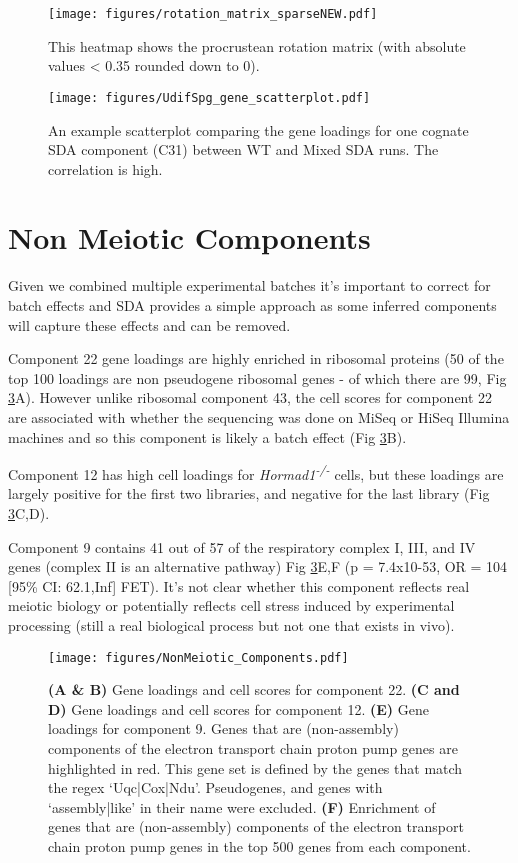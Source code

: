 \begin{figure}[H]
	\centering
	\texttt{[image: figures/rotation\_matrix\_sparseNEW.pdf]}
	\caption{This heatmap shows the procrustean rotation matrix (with absolute values < 0.35 rounded down to 0).}
	\label{fig:WT_Mix_Rotation}
\end{figure}

\begin{figure}[H]
	\centering
	\texttt{[image: figures/UdifSpg\_gene\_scatterplot.pdf]}
	\caption{An example scatterplot comparing the gene loadings for one cognate SDA component (C31) between WT and Mixed SDA runs. The correlation is high.}
	\label{fig:WT_Mix_Correlation}
\end{figure}


\section{Non Meiotic Components}

Given we combined multiple experimental batches it's important to correct for batch effects and SDA provides a simple approach as some inferred components will capture these effects and can be removed.

Component 22 gene loadings are highly enriched in ribosomal proteins (50 of the top 100 loadings are non pseudogene ribosomal genes - of which there are 99, Fig \ref{fig:NonMeiotic}A). However unlike ribosomal component 43, the cell scores for component 22 are associated with whether the sequencing was done on MiSeq or HiSeq Illumina machines and so this component is likely a batch effect (Fig \ref{fig:NonMeiotic}B).

Component 12 has high cell loadings for \textit{Hormad1\textsuperscript{-/-}} cells, but these loadings are largely positive for the first two libraries, and negative for the last library (Fig \ref{fig:NonMeiotic}C,D).

Component 9 contains 41 out of 57 of the respiratory complex I, III, and IV genes (complex II is an alternative pathway) Fig \ref{fig:NonMeiotic}E,F (p = 7.4x10-53, OR = 104 [95\% CI: 62.1,Inf] FET). It's not clear whether this component reflects real meiotic biology or potentially reflects cell stress induced by experimental processing (still a real biological process but not one that exists in vivo).

\begin{figure}[H]
	\centering
	\texttt{[image: figures/NonMeiotic\_Components.pdf]}
	\caption{
		\textbf{(A \& B)} Gene loadings and cell scores for component 22.
		\textbf{(C and D)} Gene loadings and cell scores for component 12.
		\textbf{(E)} Gene loadings for component 9. Genes that are (non-assembly) components of the electron transport chain proton pump genes are highlighted in red. This gene set is defined by the genes that match the regex ‘Uqc|Cox|Ndu’. Pseudogenes, and genes with ‘assembly|like’ in their name were excluded.
		\textbf{(F)} Enrichment of genes that are (non-assembly) components of the electron transport chain proton pump genes in the top 500 genes from each component.
	}
	\label{fig:NonMeiotic}
\end{figure}


